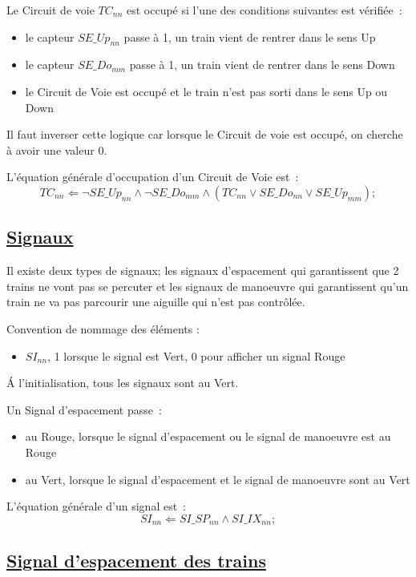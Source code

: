 \medskip
Le Circuit de voie $TC_{nn}$ est occupé si l'une des conditions suivantes
est vérifiée~:
\begin{itemize}
\item le capteur $SE\_Up_{nn}$ passe à 1, un train vient de rentrer dans
  le sens Up
\item le capteur $SE\_Do_{mm}$ passe à 1, un train vient de rentrer dans
  le sens Down
\item le Circuit de Voie est occupé et le train n'est pas sorti dans
  le sens Up ou Down
\end{itemize}

Il faut inverser cette logique car lorsque le Circuit de voie est
occupé, on cherche à avoir une valeur 0.

\medskip
L'équation générale d'occupation d'un Circuit de Voie est~:
$$\boxed{
  TC_{nn} \Leftarrow \neg SE\_Up_{nn} \land \neg SE\_Do_{mm} \land
  (TC_{nn} \lor SE\_Do_{nn} \lor SE\_Up_{mm});
}$$


\subsection{\underline{Signaux}}
\label{sec:esp}

Il existe deux types de signaux; les signaux d'espacement qui
garantissent que 2 trains ne vont pas se percuter et les signaux de
manoeuvre qui garantissent qu'un train ne va pas parcourir une
aiguille qui n'est pas contrôlée.

Convention de nommage des éléments :
\begin{itemize}
\item $SI_{nn}$, 1 lorsque le signal est Vert, 0 pour afficher un signal
  Rouge
\end{itemize}

\'A l'initialisation, tous les signaux sont au Vert.

Un Signal d'espacement passe~:
\begin{itemize}
\item au Rouge, lorsque le signal d'espacement ou le signal de
  manoeuvre est au Rouge
\item au Vert, lorsque le signal d'espacement et le signal de
  manoeuvre sont au Vert
\end{itemize}


\medskip
L'équation générale d'un signal est~:
$$\boxed{
  SI_{nn} \Leftarrow SI\_SP_{nn} \land SI\_IX_{nn};
}$$


\subsection{\underline{Signal d'espacement des trains}}
\label{sec:esp}

